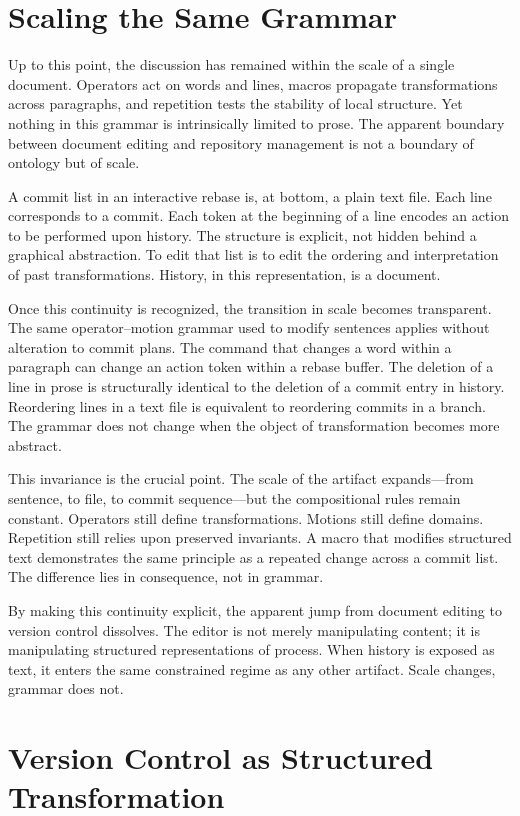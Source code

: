 \documentclass[12pt]{article}
\begin{document}
\section{Scaling the Same Grammar}

Up to this point, the discussion has remained within the scale of a single document. Operators act on words and lines, macros propagate transformations across paragraphs, and repetition tests the stability of local structure. Yet nothing in this grammar is intrinsically limited to prose. The apparent boundary between document editing and repository management is not a boundary of ontology but of scale.

A commit list in an interactive rebase is, at bottom, a plain text file. Each line corresponds to a commit. Each token at the beginning of a line encodes an action to be performed upon history. The structure is explicit, not hidden behind a graphical abstraction. To edit that list is to edit the ordering and interpretation of past transformations. History, in this representation, is a document.

Once this continuity is recognized, the transition in scale becomes transparent. The same operator–motion grammar used to modify sentences applies without alteration to commit plans. The command that changes a word within a paragraph can change an action token within a rebase buffer. The deletion of a line in prose is structurally identical to the deletion of a commit entry in history. Reordering lines in a text file is equivalent to reordering commits in a branch. The grammar does not change when the object of transformation becomes more abstract.

This invariance is the crucial point. The scale of the artifact expands—from sentence, to file, to commit sequence—but the compositional rules remain constant. Operators still define transformations. Motions still define domains. Repetition still relies upon preserved invariants. A macro that modifies structured text demonstrates the same principle as a repeated change across a commit list. The difference lies in consequence, not in grammar.

By making this continuity explicit, the apparent jump from document editing to version control dissolves. The editor is not merely manipulating content; it is manipulating structured representations of process. When history is exposed as text, it enters the same constrained regime as any other artifact. Scale changes, grammar does not.

\section{Version Control as Structured Transformation}
\end{document}
